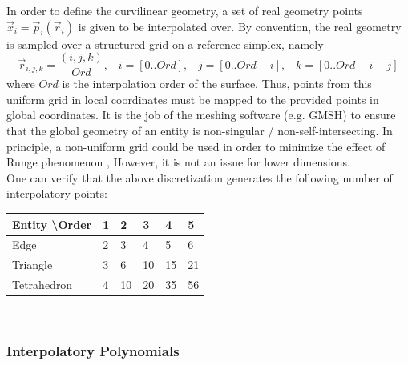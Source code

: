 \noindent
In order to define the curvilinear geometry, a set of real geometry points $\vec{x}_i = \vec{p}_i(\vec{r}_i)$ is given to be interpolated over. By convention, the real geometry is sampled over a structured grid on a reference simplex, namely
\[\vec{r}_{i,j,k} = \frac{(i,j,k)}{Ord}, \;\;\; i=[0..Ord], \;\;\; j=[0..Ord-i], \;\;\; k=[0..Ord-i-j]\]
where $Ord$ is the interpolation order of the surface. Thus, points from this uniform grid in local coordinates must be mapped to the provided points in global coordinates. It is the job of the meshing software (e.g. GMSH\citeGMSH{}) to ensure that the global geometry of an entity is non-singular / non-self-intersecting. In principle, a non-uniform grid could be used in order to minimize the effect of Runge phenomenon \cite{runge1901}, However, it is not an issue for lower dimensions. \\

\noindent
One can verify that the above discretization generates the following number of interpolatory points: \\

\noindent
\begin{tabular}{l l l l l l}
\hline
  Entity \textbackslash Order & 1 & 2  & 3  & 4  & 5 \\ \hline
  Edge                        & 2 & 3  & 4  & 5  & 6 \\
  Triangle                    & 3 & 6  & 10 & 15 & 21 \\
  Tetrahedron                 & 4 & 10 & 20 & 35 & 56 \\
\end{tabular} \\


\subsubsection{Interpolatory Polynomials}
\label{theory-lagrange-polynomials}

